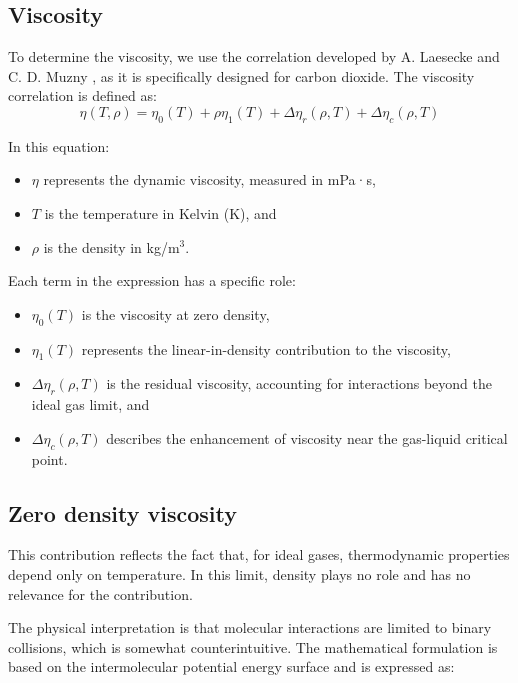 \subsection{Viscosity}

To determine the viscosity, we use the correlation developed by A. Laesecke and
C. D. Muzny \cite{laesecke2017reference}, as it is specifically designed for
carbon dioxide. The viscosity correlation is defined as:
\begin{equation}
    \eta(T,\rho) = \eta_0(T) + \rho\eta_1(T) + \Delta\eta_r(\rho,T) + \Delta\eta_c(\rho,T)
\end{equation}

In this equation:
\begin{itemize}
    \item $\eta$ represents the dynamic viscosity, measured in mPa·s,
    \item $T$ is the temperature in Kelvin (K), and
    \item $\rho$ is the density in kg/m$^3$.
\end{itemize}

Each term in the expression has a specific role:
\begin{itemize}
    \item $\eta_0(T)$ is the viscosity at zero density,
    \item $\eta_1(T)$ represents the linear-in-density contribution to the viscosity,
    \item $\Delta \eta_r(\rho, T)$ is the residual viscosity, accounting for interactions beyond the ideal gas limit, and
    \item $\Delta \eta_c(\rho, T)$ describes the enhancement of viscosity near the gas-liquid critical point.
\end{itemize}

\subsection{Zero density viscosity}

This contribution reflects the fact that, for ideal gases, thermodynamic
properties depend only on temperature. In this limit, density plays no role and
has no relevance for the contribution.

The physical interpretation is that molecular interactions are limited to binary
collisions, which is somewhat counterintuitive. The mathematical formulation is
based on the intermolecular potential energy surface and is expressed as:

